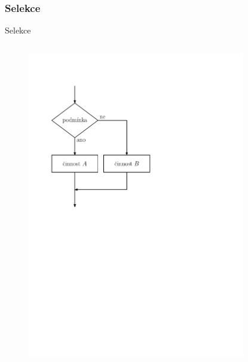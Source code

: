 \documentclass[11pt,aspectratio=169]{beamer}
\begin{document}
    \subsubsection{Selekce}
    \begin{frame}{Selekce}
        \begin{columns}
            \begin{column}{.5\textwidth}
                \begin{figure}
                    \centering
                    \includegraphics[scale=.5]{../images/00-vyvojak-selekce.pdf}
                \end{figure}
            \end{column}
            \begin{column}{.5\textwidth}
                \begin{figure}
                    \centering

\end{figure}
\end{column}
\end{columns}
\end{frame}
\end{document}
